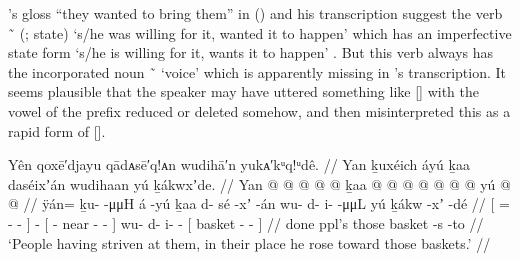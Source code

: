 \citeauthor{swanton:1909}’s gloss “they wanted to bring them” in (\lastx) and his transcription  suggest the verb  \~\  (;  state) ‘s/he was willing for it, wanted it to happen’ which has an imperfective state form  ‘s/he is willing for it, wants it to happen’ \parencite[01/44]{leer:1973}.
But this verb always has the incorporated noun  \~\  ‘voice’ which is apparently missing in \citeauthor{swanton:1909}’s transcription.
It seems plausible that the speaker may have uttered something like [] with the vowel of the prefix  reduced or deleted somehow, and \citeauthor{swanton:1909} then misinterpreted this as a rapid form of [].

\ex\label{ex:92-204-having-exerted-he-rose-for-them}%
%
\begingl
	\glpreamble	Yên qoxē′djayu qādᴀsē′q!ᴀn wudihā′n yukᴀ′kᵘq!ᵘdê. //
	\glpreamble	Yan ḵuxéich áyú ḵaa daséixʼán wudihaan yú ḵákwxʼde.  //
	\gla	{} Yan  @ {} @ {} @ {} @ {} {}  @ {}
		{} ḵaa  @ {} @ {} @ {} {}
		 @ {} @ {} @ {} @ {}
		{} yú  @ {} @ {} {} //
	\glb	{} ÿán= ḵu- {}  -μμH {} {} á -yú
		{} ḵaa d- sé -xʼ -án {}
		wu- d- i-  -μμL
		{} yú ḵákw -xʼ -dé {} //
	\glc	{}[ = - \·  - \· {}]  -
		{}[  - near - - {}]
		wu- d- i-  -
		{}[  basket - - {}] //
	\gld	{} done  {} {} {} {} {}  {}
		{} ppl’s  {} {} {} {}
		 {} {} {} {}
		{} those basket -s -to {} //
	\glft	‘People having striven at them, in their place he rose toward those baskets.’
		//
\endgl
\xe



